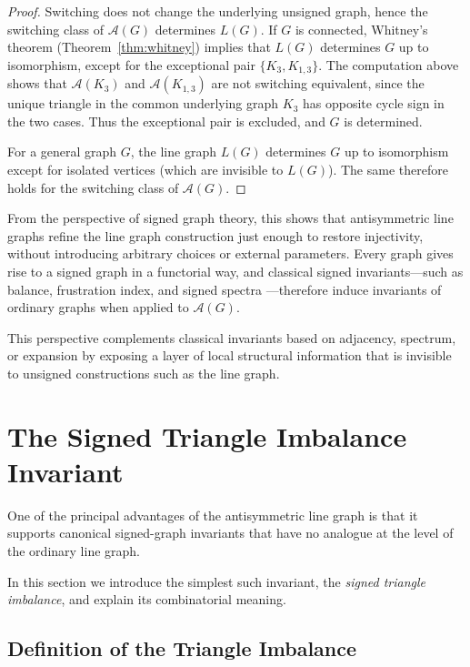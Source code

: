 \documentclass[11pt]{article}
\theoremstyle{plain}
\begin{document}
\begin{proof}
Switching does not change the underlying unsigned graph, hence the switching class of $\mathcal A(G)$
determines $L(G)$.
If $G$ is connected, Whitney's theorem (Theorem~\ref{thm:whitney}) implies that $L(G)$ determines $G$
up to isomorphism, except for the exceptional pair $\{K_3,K_{1,3}\}$.
The computation above shows that
$\mathcal A(K_3)$ and $\mathcal A(K_{1,3})$ are not switching equivalent, since the unique triangle
in the common underlying graph $K_3$ has opposite cycle sign in the two cases.
Thus the exceptional pair is excluded, and $G$ is determined.

For a general graph $G$, the line graph $L(G)$ determines $G$ up to isomorphism except for isolated
vertices (which are invisible to $L(G)$). The same therefore holds for the switching class of $\mathcal A(G)$.
\end{proof}

From the perspective of signed graph theory, this shows that antisymmetric line
graphs refine the line graph construction just enough to restore injectivity,
without introducing arbitrary choices or external parameters. Every graph gives rise to a signed graph in a functorial way, and classical signed
invariants—such as balance, frustration index, and signed spectra
\cite{Zaslavsky1998,BronskiDeVille2014}—therefore induce invariants of ordinary graphs when applied to $\mathcal{A}(G)$.

This perspective complements classical invariants based on adjacency,
spectrum, or expansion by exposing a layer of local structural information
that is invisible to unsigned constructions such as the line graph.



\section{The Signed Triangle Imbalance Invariant}
\label{sec:triangle}

One of the principal advantages of the antisymmetric line graph is that it
supports canonical signed-graph invariants that have no analogue at the level of
the ordinary line graph.

In this section we introduce the simplest such invariant, the \emph{signed
triangle imbalance}, and explain its combinatorial meaning.

\subsection{Definition of the Triangle Imbalance}
\end{document}
